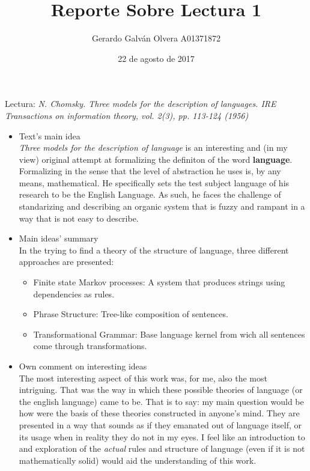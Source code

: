 \documentclass[11pt,a4paper]{article}
\title{Reporte Sobre Lectura 1}
\author{Gerardo Galván Olvera A01371872}
\date{22 de agosto de 2017}
\begin{document}
            \maketitle
            Lectura: \textit{N. Chomsky. Three models for the description of languages. IRE Transactions on information theory, vol. 2(3), pp. 113-124 (1956)}

            \begin{itemize}
                \item Text's main idea\\
                    \textit{Three models for the description of language} is an interesting and (in my view) original attempt at formalizing the definiton of the word \textbf{language}. Formalizing in the sense that the level of abstraction he uses is, by any means, mathematical. He specifically sets the test subject language of his research to be the English Language. As such, he faces the challenge of standarizing and describing an organic system that is fuzzy and rampant in a way that is not easy to describe.
                   
                \item Main ideas' summary\\
                In the trying to find a theory of the structure of language, three different approaches are presented:
                    \begin{itemize}
                        \item Finite state Markov processes: A system that produces strings using dependencies as rules.
                        \item Phrase Structure: Tree-like composition of sentences.
                        \item Transformational Grammar: Base language kernel from wich all sentences come through transformations.
                    \end{itemize}
                \item Own comment on interesting ideas\\
                    The most interesting aspect of this work was, for me, also the most intriguing. That was the way in which these possible theories of language (or the english language) came to be. That is to say: my main question would be how were the basis of these theories constructed in anyone's mind. They are presented in a way that sounds as if they emanated out of language itself, or its usage when in reality they do not in my eyes. I feel like an introduction to and exploration of the \textit{actual} rules and structure of language (even if it is not mathematically solid) would aid the understanding of this work.
            \end{itemize}
    
        
\end{document}
